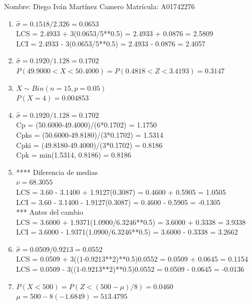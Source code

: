\documentclass[8pt]{report}
\begin{document}
 \newpage

Nombre: \underline{\hspace*{.2in}}
Diego Iván Martínez Camero
\underline{\hspace*{.2in}} \quad Matr\'icula:\underline{\hspace*{.2in}}
A01742276
\underline{\hspace*{.2in}} \\

\begin{enumerate}
\item $\hat\sigma = 0.1518/2.326 = 0.0653$\\
LCS = 2.4933 + 3(0.0653/5**0.5) = 2.4933 + 0.0876 = 2.5809\\
LCI = 2.4933 - 3(0.0653/5**0.5) = 2.4933 - 0.0876 = 2.4057
\item $\hat\sigma = 0.1920/1.128 = 0.1702$\\
$P(49.9000 < X < 50.4000) = P(0.4818 < Z < 3.4193) = 0.3147$\\
\item $X \sim Bin(n=15, p=0.05)$\\
$P(X = 4) = 0.004853$
\item $\hat\sigma = 0.1920/1.128 = 0.1702$\\
Cp = (50.6000-49.4000)/(6*0.1702) = 1.1750\\
Cpks = (50.6000-49.8180)/(3*0.1702) = 1.5314\\
Cpki = (49.8180-49.4000)/(3*0.1702) = 0.8186\\
Cpk = min(1.5314, 0.8186) = 0.8186
\item **** Diferencia de medias\\
$\nu = 68.3055$\\
LCS = 3.60 - 3.1400 + 1.9127(0.3087) = 0.4600 + 0.5905 = 1.0505\\
LCI = 3.60 - 3.1400 - 1.9127(0.3087) = 0.4600 - 0.5905 = -0.1305\\
*** Antes del cambio\\
LCS = 3.6000 + 1.9371(1.0900/6.3246**0.5) = 3.6000 + 0.3338 = 3.9338\\
LCI = 3.6000 - 1.9371(1.0900/6.3246**0.5) = 3.6000 - 0.3338 = 3.2662\\
\item $\hat\sigma = 0.0509/0.9213 = 0.0552$\\
LCS = 0.0509 + 3((1-0.9213**2)**0.5)0.0552 = 0.0509 + 0.0645 = 0.1154\\
LCS = 0.0509 - 3((1-0.9213**2)**0.5)0.0552 = 0.0509 - 0.0645 = -0.0136
\item $P(X < 500) = P(Z < (500-\mu)/8) = 0.0460$\\
$\mu = 500 - 8(-1.6849) = 513.4795$\\
\end{enumerate}
\end{document}
